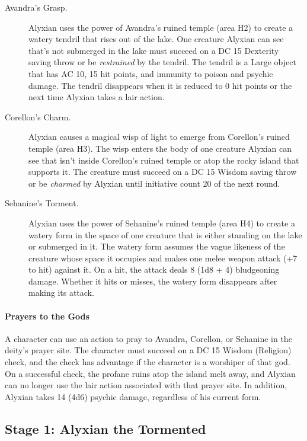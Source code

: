 \documentclass[letterpaper, 11pt, bg=full, twocolumn]{dndbook}
\begin{document}
\begin{description}
\item[Avandra's Grasp.] Alyxian uses the power of Avandra's ruined temple (area H2) to create a watery tendril that rises out of the lake. One creature Alyxian can see that's not submerged in the lake must succeed on a DC 15 Dexterity saving throw or be \textit{restrained} by the tendril. The tendril is a Large object that has AC 10, 15 hit points, and immunity to poison and psychic damage. The tendril disappears when it is reduced to 0 hit points or the next time Alyxian takes a lair action.
\item[Corellon's Charm.] Alyxian causes a magical wisp of light to emerge from Corellon's ruined temple (area H3). The wisp enters the body of one creature Alyxian can see that isn't inside Corellon's ruined temple or atop the rocky island that supports it. The creature must succeed on a DC 15 Wisdom saving throw or be \textit{charmed} by Alyxian until initiative count 20 of the next round.
\item[Sehanine's Torment.] Alyxian uses the power of Sehanine's ruined temple (area H4) to create a watery form in the space of one creature that is either standing on the lake or submerged in it. The watery form assumes the vague likeness of the creature whose space it occupies and makes one melee weapon attack (+7 to hit) against it. On a hit, the attack deals 8 (1d8 + 4) bludgeoning damage. Whether it hits or misses, the watery form disappears after making its attack.
\end{description}

\paragraph{Prayers to the Gods}

A character can use an action to pray to Avandra, Corellon, or Sehanine in the deity's prayer site. The character must succeed on a DC 15 Wisdom (Religion) check, and the check has advantage if the character is a worshiper of that god. On a successful check, the profane ruins atop the island melt away, and Alyxian can no longer use the lair action associated with that prayer site. In addition, Alyxian takes 14 (4d6) psychic damage, regardless of his current form.


\subsection{Stage 1: Alyxian the Tormented}
\end{document}
